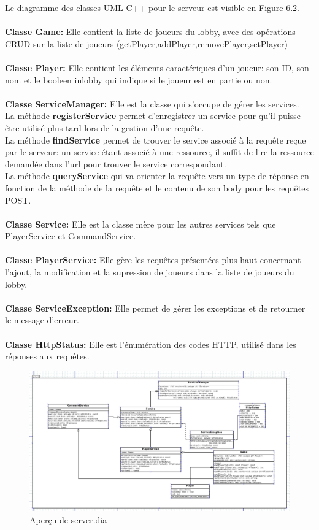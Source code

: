 Le diagramme des classes UML C++ pour le serveur est
visible en Figure 6.2.
\\\\
\textbf{Classe Game:} Elle contient la liste de joueurs du 
lobby, 
avec des opérations CRUD sur la liste de joueurs 
(getPlayer,addPlayer,removePlayer,setPlayer)
\\\\
\textbf{Classe Player:} Elle contient les éléments 
caractériques d'un joueur: son ID, son nom et le booleen 
inlobby qui indique si le joueur est en partie ou non. 
\\\\
\textbf{Classe ServiceManager:} Elle est la classe qui 
s'occupe de gérer les services. 
\\La méthode \textbf{registerService}
permet d'enregistrer un service pour qu'il puisse être 
utilisé plus tard lors de la gestion d'une requête.
\\La méthode \textbf{findService} permet 
de trouver le service associé 
à la requête reçue par le serveur: un service étant associé 
à une ressource, il suffit de lire la ressource demandée 
dans l'url pour trouver le service correspondant.
\\La méthode \textbf{queryService} qui va orienter la 
requête vers un type de réponse en fonction 
de la méthode de la requête et 
le contenu de son body pour les requêtes POST.
\\\\
\textbf{Classe Service:} Elle est la classe mère pour
les autres services tels que PlayerService et 
CommandService.
\\\\
\textbf{Classe PlayerService:} Elle gère les requêtes 
présentées plus haut concernant l'ajout, la modification et 
la supression de joueurs dans la liste de joueurs du lobby. 
\\\\
\textbf{Classe ServiceException:} Elle permet de gérer 
les exceptions et de retourner le message d'erreur.
\\\\
\textbf{Classe HttpStatus:} Elle est l'énumération des codes HTTP, utilisé dans les réponses aux requêtes. 

\begin{figure}[H]
\includegraphics[width=\linewidth]{images/server_dia.png}
\centering
\caption{Aperçu de server.dia}
\label{fig:img7}
\end{figure}
\newpage
